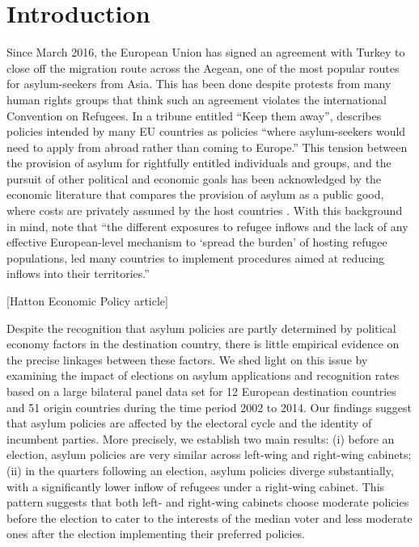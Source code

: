 \documentclass[a4paper,12pt]{article}
\begin{document}
\section{Introduction}\label{Introduction}
Since March 2016, the European Union has signed an agreement with Turkey to close off the migration route across the Aegean, one of the most popular routes for asylum-seekers from Asia. This has been done despite protests from many human rights groups that think such an agreement violates the international Convention on Refugees. In a tribune entitled ``Keep them away'', \textit{\cite{Economist2017}} describes policies intended by many EU countries as policies ``where asylum-seekers would need to apply from abroad rather than coming to Europe.'' This tension between the provision of asylum for rightfully entitled individuals and groups, and the pursuit of other political and economic goals has been acknowledged by the economic literature that compares the provision of asylum as a public good, where costs are privately assumed by the host countries \citep{moraga2014}. With this background in mind, \cite{dustmann2016} note that ``the  different  exposures  to  refugee  inflows and  the  lack  of  any  effective  European-level  mechanism  to  `spread  the  burden'  of  hosting  refugee  populations,  led  many  countries  to  implement  procedures  aimed  at  reducing  inflows  into  their  territories.''

[Hatton Economic Policy article]

Despite the recognition that asylum policies are partly determined by political economy factors in the destination country, there is little empirical evidence on the precise linkages between these factors. We shed light on this issue by examining the impact of elections on asylum applications and recognition rates based on a large bilateral panel data set for 12 European destination countries and 51 origin countries during the time period 2002 to 2014. Our findings suggest that asylum policies are affected by the electoral cycle and the identity of incumbent parties. More precisely, we establish two main results: (i) before an election, asylum policies are very similar across left-wing and right-wing cabinets; (ii)  in the quarters following an election, asylum policies diverge substantially, with a significantly lower inflow of refugees under a right-wing cabinet. This pattern suggests that both left- and right-wing cabinets choose moderate policies before the election to cater to the interests of the median voter and less moderate ones after the election implementing their preferred policies. 
\end{document}
